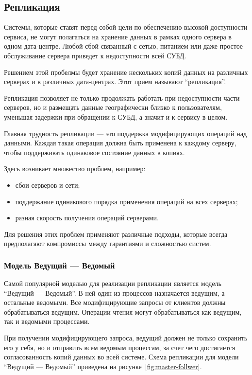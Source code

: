 \documentclass[14pt, russian]{scrartcl}
\begin{document}
\subsection{Репликация}

Системы, которые ставят перед собой цели по обеспечению высокой доступности
сервиса, не могут полагаться на хранение данных в рамках одного сервера в одном
дата-центре. Любой сбой связанный с сетью, питанием или даже простое
обслуживание сервера приведет к недоступности всей СУБД.

Решением этой пробелмы будет хранение нескольких копий данных на различных
серверах и в различных дата-центрах. Этот прием называют ``репликация''.

Репликация позволяет не только продолжать работать при недоступности части
серверов, но и размещать данные географически близко к пользователям, уменьшая
задержки при обращении к СУБД, а значит и к сервису в целом.

Главная трудность репликации --- это поддержка модифицирующих операций над
данными. Каждая такая операция должна быть применена к каждому серверу, чтобы
поддерживать одинаковое состояние данных в копиях.

Здесь возникает множество проблем, например:
\begin{itemize}
  \item сбои серверов и сети;
  \item поддержание одинакового порядка применения операций на всех серверах;
  \item разная скорость получения операций серверами.
\end{itemize}

Для решения этих проблем применяют различные подходы, которые всегда
предполагают компромиссы между гарантиями и сложностью систем.

\subsubsection{Модель Ведущий --- Ведомый}

Самой популярной моделью для реализации репликации является модель ``Ведущий ---
Ведомый''. В ней один из процессов назначается ведущим, а остальные ведомыми.
Все модифицирующие запросы от клиентов должны обрабатываться ведущим. Операции
чтения могут обрабатываться как ведущим, так и ведомыми процессами.

При получении модифицирующего запроса, ведущий должен не только сохранить его у
себя, но и отправить всем ведомым процессам, за счет чего достигается
согласованность копий данных во всей системе. Схема репликации для модели
``Ведущий --- Ведомый'' приведена на рисунке~\ref{fig:master-follwer}.
\end{document}

